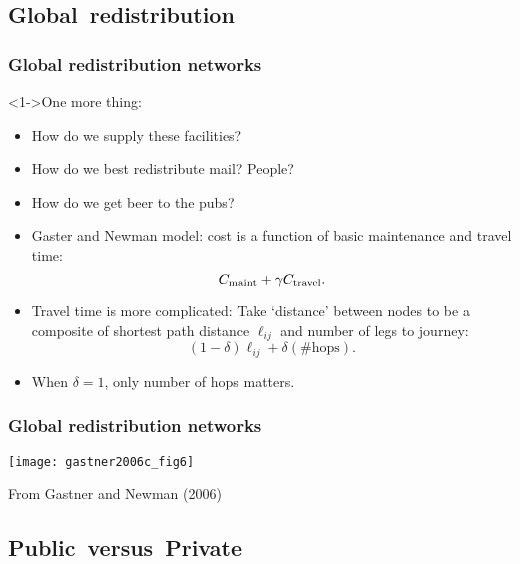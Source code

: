 \subsection{Global\ redistribution}

\begin{frame}
  \frametitle{Global redistribution networks}

  \begin{block}<1->{One more thing:}
    \begin{itemize}
    \item<1-> How do we supply these facilities?
    \item<2-> How do we best redistribute mail?  People?
    \item<3-> How do we get beer to the pubs?
    \item<4-> Gaster and Newman model: cost is 
      a function of basic maintenance and travel time:
      $$
      C_{\textnormal{maint}} + \gamma C_{\textnormal{travel}}.
      $$
    \item<5-> Travel time is more complicated:
      Take `distance' between nodes to be a composite
      of shortest path distance $\ell_{ij}$ and 
      number of legs to journey:
      $$
      (1-\delta) \ell_{ij} + \delta (\# \mbox{hops}).
      $$
    \item<6-> When $\delta=1$, only number of hops matters.
      
      
    \end{itemize}
  \end{block}

\end{frame}

\begin{frame}
  \frametitle{Global redistribution networks}

  \texttt{[image: gastner2006c\_fig6]}

  From Gastner and Newman (2006)\cite{gastner2006c}
\end{frame}

\subsection{Public\ versus\ Private}

